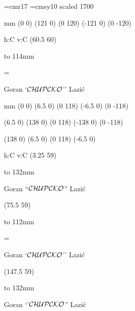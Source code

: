 
\vsize=277mm
\hsize=190mm
\voffset=-15.4mm
\hoffset=-15.4mm
\nopagenumbers


\def\CDdown#1#2#3{%
  \btexdraw
    \drawdim mm
    \linewd 0.1
    \move(0 0)
    \rlvec(6.5 0)
    \rlvec(0 118)
    \rlvec(-6.5 0)
    \rlvec(0 -118)

    \rmove(6.5 0)
    \rlvec(138 0)
    \rlvec(0 118)
    \rlvec(-138 0)
    \rmove(0 -118)

    \rmove(138 0)
    \rlvec(6.5 0)
    \rlvec(0 118)
    \rlvec(-6.5 0)

    \textref h:C v:C
    \vtext(3.25 59)
    {
      \hbox to 132mm
      {
        #1
      }
    }
    \htext(75.5 59)
    {
      \vbox to 112mm
      {
        \hsize=132mm
        #2
        \vfil
      }
    }
    \vtext(147.5 59)
    {
      \hbox to 132mm
      {
        #3
      }
    }
  \etexdraw
}
\def\CDup#1{%
  \btexdraw
    \drawdim mm
    \linewd 0.1
    \move(0 0)
    \rlvec(121 0)
    \rlvec(0 120)
    \rlvec(-121 0)
    \rlvec(0 -120)

    \textref h:C v:C
    \htext(60.5 60)
    {
      \vbox to 114mm
      {
        \hsize=115mm
        #1
        \vfil
      }
    }
  \etexdraw
}

\font\myrm=cmr17
\font\mysy=cmsy10 scaled 1700

\CDup
{
 {
  =\mysy
  \myrm
  \vfil
  \centerline{Goran `$\cal CHUPCKO$'' Lazi\'c}
  }
}

\vskip 5mm

\CDdown
{
  \hfil Goran ``$\cal CHUPCKO$'' Lazi\'c\hfil
}
{
  \textfont2=\mysy
  \myrm
  \vfil
  \centerline{Goran `$\cal CHUPCKO$'' Lazi\'c}
}
{
  \hfil Goran `'$\cal CHUPCKO$'' Lazi\'c\hfil
}
\bye
